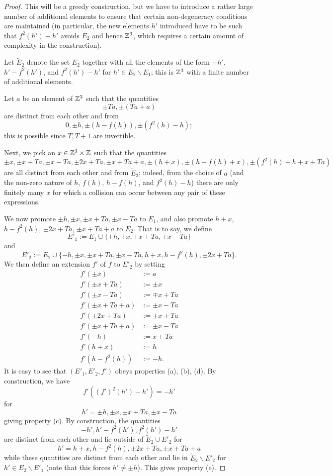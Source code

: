 \begin{proof} This will be a greedy construction, but we have to introduce a rather large number of additional elements to ensure that certain non-degeneracy conditions are maintained (in particular, the new elements $h'$ introduced have to be such that $f^2(h') - h'$ avoids $E_2$ and hence $\mathbb{Z}^3$, which requires a certain amount of complexity in the construction).

  Let $\tilde E_2$ denote the set $E_2$ together with all the elements of the form $-h'$, $h' - f^2(h')$, and $f^2(h') - h'$ for $h' \in E_2 \backslash E_1$; this is $\mathbb{Z}^3$ with a finite number of additional elements.

Let $a$ be an element of $\mathbb{Z}^3$ such that the quantities
$$ \pm Ta, \pm(Ta + a)$$
are distinct from each other and from
$$0, \pm h, \pm (h - f(h)), \pm (f^2(h)-h);$$
this is possible since $T, T+1$ are invertible.

Next, we pick an $x \in \mathbb{Z}^3 \times \mathbb{Z}$ such that the quantities
$$ \pm x, \pm x + Ta, \pm x - Ta, \pm 2 x + Ta, \pm x + Ta + a, \pm (h + x), \pm (h - f(h) + x), \pm (f^2(h)-h + x + Ta)$$
are all distinct from each other and from $\tilde E_2$; indeed, from the choice of $a$ (and the non-zero nature of $h$, $f(h)$, $h-f(h)$, and $f^2(h)-h$) there are only finitely many $x$ for which a collision can occur between any pair of these expressions.

We now promote $\pm h, \pm x, \pm x + Ta, \pm x - Ta$ to $E_1$, and also promote $h+x$, $h - f^2(h)$, $\pm 2x + Ta$, $\pm x + Ta + a$ to $E_2$.  That is to say, we define
$$ E'_1 := E_1 \cup \{\pm h, \pm x, \pm x + Ta, \pm x - Ta\}$$
and
$$ E'_2 := E_2 \cup \{ -h, \pm x, \pm x + Ta, \pm x - Ta, h + x, h - f^2(h), \pm 2x + Ta \}.$$
We then define an extension $f'$ of $f$ to $E'_2$ by setting
\begin{align*}
 f'(\pm x) &:= a \\
 f'(\pm x + Ta) &:= \pm x \\
 f'(\pm x - Ta) &:= \mp x + Ta \\
 f'(\pm x + Ta + a) &:= \pm x - Ta \\
 f'(\pm 2x + Ta) &:= \pm x + Ta \\
 f'(\pm x + Ta + a) &:= \pm x - Ta \\
 f'(-h) &:= x + Ta \\
 f'(h+x) &:= h \\
 f'(h - f^2(h)) &:= -h.
\end{align*}
It is easy to see that $(E'_1,E'_2,f')$ obeys properties (a), (b), (d).  By construction, we have
$$ f'( (f')^2(h') - h') = -h'$$
for
$$ h' = \pm h, \pm x, \pm x+Ta, \pm x-Ta$$
giving property (c).  By construction, the quantities
$$ -h', h' - f^2(h'), f^2(h') - h'$$
are distinct from each other and lie outside of $\tilde E_2 \cup E'_2$ for
$$ h' = h+x, h - f^2(h), \pm 2x + Ta, \pm x + Ta + a$$
while these quantities are distinct from each other and lie in $\tilde E_2 \backslash E'_2$ for $h' \in E_2 \backslash E'_1$ (note that this forces $h' \neq \pm h$).  This gives property (e).
\end{proof}


